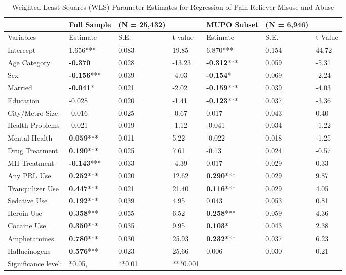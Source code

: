 \documentclass[sigconf]{acmart}
\begin{document}
\begin{table*}[ht]
  \caption{Weighted Least Squares (WLS) Parameter Estimates for Regression 
  of Pain Reliever Misuse and Abuse}
  \label{tab:freq}
  \begin{tabular}{lllllll}
    \toprule
     & Full Sample& (N = 25,432)&& MUPO Subset& (N = 6,946)&  \\
    \midrule
    Variables & Estimate& S.E.& t-value& Estimate& S.E.& t-Value  \\
    \midrule
    Intercept& 1.656***& 0.083& 19.85& 6.870***& 0.154& 44.72 \\
    Age Category& \textbf{-0.370}& 0.028& -13.23& \textbf{-0.312}***& 0.059& -5.31 \\
    Sex& \textbf{-0.156}***& 0.039& -4.03& \textbf{-0.154}*& 0.069& -2.24  \\
    Married& \textbf{-0.041}*& 0.021& -2.02& \textbf{-0.159}***& 0.039& -4.03  \\
    Education& -0.028& 0.020& -1.41& \textbf{-0.123}***& 0.037& -3.36 \\
    City/Metro Size& -0.016& 0.025& -0.67& 0.017& 0.043& 0.40 \\
    Health Problems& -0.021& 0.019& -1.12& -0.041& 0.034& -1.22 \\
    Mental Health& \textbf{0.059}***& 0.011& 5.22& -0.022& 0.018& -1.25 \\
    Drug Treatment& \textbf{0.190}***& 0.025& 7.61& -0.13& 0.024& -0.57 \\
    MH Treatment& \textbf{-0.143}***& 0.033& -4.39& 0.017& 0.029& 0.33 \\
    Any PRL Use& \textbf{0.252}***& 0.020& 12.62& \textbf{0.290}***& 0.029& 9.87 \\
    Tranquilizer Use& \textbf{0.447}***& 0.021& 21.40& \textbf{0.116}***& 0.029& 4.05 \\
    Sedative Use& \textbf{0.192}***& 0.039& 4.95& 0.043& 0.053& 0.81 \\
    Heroin Use& \textbf{0.358}***& 0.055& 6.52& \textbf{0.258}***& 0.059& 4.36 \\
    Cocaine Use& \textbf{0.350}***& 0.035& 9.95& \textbf{0.103}*& 0.043& 2.38 \\
    Amphetamines& \textbf{0.780}***& 0.030& 25.93& \textbf{0.232}***& 0.037& 6.23 \\
    Hallucinogens& \textbf{0.576}***& 0.023& 25.66& 0.006& 0.030& 0.21 \\
    \bottomrule
    Significance level:& *0.05,& **0.01& ***0.001&&&
  \end{tabular}
\end{table*}
\end{document}
